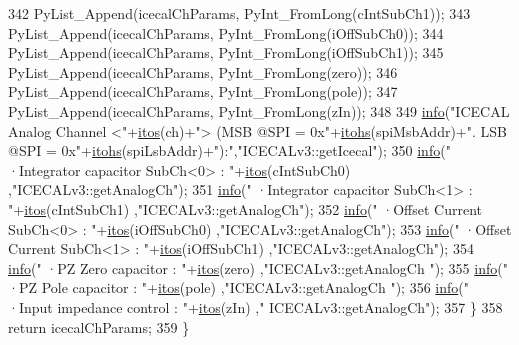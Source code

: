 \begin{DoxyCode}
342         PyList\_Append(icecalChParams, PyInt\_FromLong(cIntSubCh1));
343         PyList\_Append(icecalChParams, PyInt\_FromLong(iOffSubCh0));
344         PyList\_Append(icecalChParams, PyInt\_FromLong(iOffSubCh1));
345         PyList\_Append(icecalChParams, PyInt\_FromLong(zero));
346         PyList\_Append(icecalChParams, PyInt\_FromLong(pole));
347         PyList\_Append(icecalChParams, PyInt\_FromLong(zIn));
348 
349         \hyperlink{classObject_a644fd329ea4cb85f54fa6846484b84a8}{info}(\textcolor{stringliteral}{"ICECAL Analog Channel <"}+\hyperlink{Tools_8h_af330027dbdafb9a30768b3613c553e60}{itos}(ch)+\textcolor{stringliteral}{"> (MSB @SPI = 0x"}+\hyperlink{classICECALv3_a04b02e583f191bfce34d05132cd23834}{itohs}(spiMsbAddr)+\textcolor{stringliteral}{". LSB
       @SPI = 0x"}+\hyperlink{classICECALv3_a04b02e583f191bfce34d05132cd23834}{itohs}(spiLsbAddr)+\textcolor{stringliteral}{"):"},\textcolor{stringliteral}{"ICECALv3::getIcecal"});
350         \hyperlink{classObject_a644fd329ea4cb85f54fa6846484b84a8}{info}(\textcolor{stringliteral}{"   ·Integrator capacitor SubCh<0> : "}+\hyperlink{Tools_8h_af330027dbdafb9a30768b3613c553e60}{itos}(cIntSubCh0)    ,\textcolor{stringliteral}{"ICECALv3::getAnalogCh"});
351         \hyperlink{classObject_a644fd329ea4cb85f54fa6846484b84a8}{info}(\textcolor{stringliteral}{"   ·Integrator capacitor SubCh<1> : "}+\hyperlink{Tools_8h_af330027dbdafb9a30768b3613c553e60}{itos}(cIntSubCh1)    ,\textcolor{stringliteral}{"ICECALv3::getAnalogCh"});
352         \hyperlink{classObject_a644fd329ea4cb85f54fa6846484b84a8}{info}(\textcolor{stringliteral}{"   ·Offset Current SubCh<0>       : "}+\hyperlink{Tools_8h_af330027dbdafb9a30768b3613c553e60}{itos}(iOffSubCh0)    ,\textcolor{stringliteral}{"ICECALv3::getAnalogCh"});
353         \hyperlink{classObject_a644fd329ea4cb85f54fa6846484b84a8}{info}(\textcolor{stringliteral}{"   ·Offset Current SubCh<1>       : "}+\hyperlink{Tools_8h_af330027dbdafb9a30768b3613c553e60}{itos}(iOffSubCh1)    ,\textcolor{stringliteral}{"ICECALv3::getAnalogCh"});
354         \hyperlink{classObject_a644fd329ea4cb85f54fa6846484b84a8}{info}(\textcolor{stringliteral}{"   ·PZ Zero capacitor             : "}+\hyperlink{Tools_8h_af330027dbdafb9a30768b3613c553e60}{itos}(zero)              ,\textcolor{stringliteral}{"ICECALv3::getAnalogCh
      "});
355         \hyperlink{classObject_a644fd329ea4cb85f54fa6846484b84a8}{info}(\textcolor{stringliteral}{"   ·PZ Pole capacitor             : "}+\hyperlink{Tools_8h_af330027dbdafb9a30768b3613c553e60}{itos}(pole)              ,\textcolor{stringliteral}{"ICECALv3::getAnalogCh
      "});
356         \hyperlink{classObject_a644fd329ea4cb85f54fa6846484b84a8}{info}(\textcolor{stringliteral}{"   ·Input impedance control       : "}+\hyperlink{Tools_8h_af330027dbdafb9a30768b3613c553e60}{itos}(zIn)                   ,\textcolor{stringliteral}{"
      ICECALv3::getAnalogCh"});
357     \}
358     \textcolor{keywordflow}{return} icecalChParams;
359 \}
\end{DoxyCode}
\mbox{\label{classICECALv3_a7a1c1706a455903f42bb9a5257d94a78}} 
